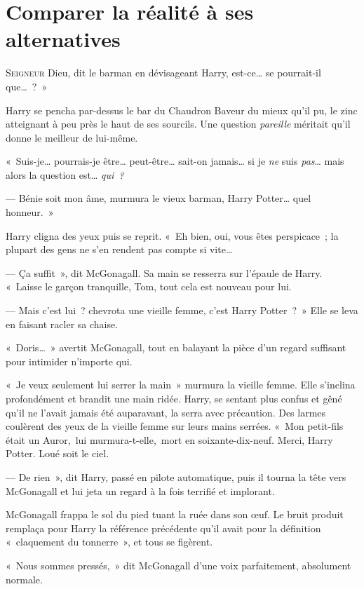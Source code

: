 \chapter{Comparer la réalité à ses alternatives}

\lettrine[ante=«~]{S}{eigneur} Dieu, dit le barman en dévisageant Harry, est-ce… se pourrait-il que…~?~»

Harry se pencha par-dessus le bar du Chaudron Baveur du mieux qu'il pu, le zinc atteignant à peu près le haut de ses sourcils. Une question \emph{pareille} méritait qu'il donne le meilleur de lui-même.

«~Suis-je… pourrais-je être… peut-être… sait-on jamais… si je \emph{ne} suis \emph{pas}… mais alors la question est… \emph{qui~?}

--- Bénie soit mon âme, murmura le vieux barman, Harry Potter… quel honneur.~»

Harry cligna des yeux puis se reprit.  «~Eh bien, oui, vous êtes perspicace~; la plupart des gens ne s'en rendent pas compte si vite…

--- Ça suffit~», dit McGonagall.  Sa main se resserra sur l'épaule de Harry. «~Laisse le garçon tranquille, Tom, tout cela est nouveau pour lui.

--- Mais c'est lui~? chevrota une vieille femme, c'est Harry Potter~?~» Elle se leva en faisant racler sa chaise.

«~Doris…~» avertit McGonagall, tout en balayant la pièce d'un regard suffisant pour intimider n'importe qui.

«~Je veux seulement lui serrer la main~» murmura la vieille femme. Elle s'inclina profondément et brandit une main ridée. Harry, se sentant plus confus et gêné qu'il ne l'avait jamais été auparavant, la serra avec précaution.  Des larmes coulèrent des yeux de la vieille femme sur leurs mains serrées. «~Mon petit-fils était un Auror,~lui murmura-t-elle,~mort en soixante-dix-neuf. Merci, Harry Potter. Loué soit le ciel.

--- De rien~», dit Harry, passé en pilote automatique, puis il tourna la tête vers McGonagall et lui jeta un regard à la fois terrifié et implorant.

McGonagall frappa le sol du pied tuant la ruée dans son œuf. Le bruit produit remplaça pour Harry la référence précédente qu'il avait pour la définition «~claquement du tonnerre~», et tous se figèrent.

«~Nous sommes pressés,~» dit McGonagall d'une voix parfaitement, absolument normale.

